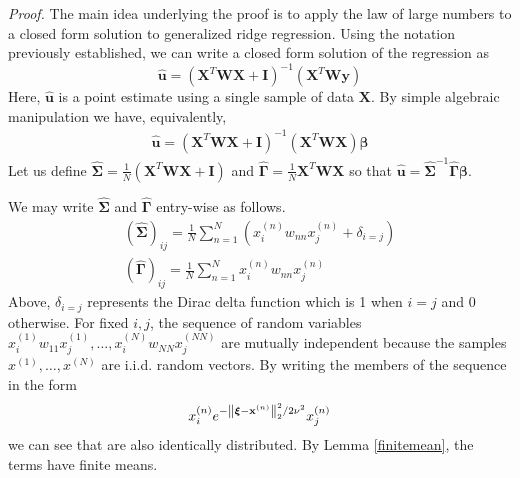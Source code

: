 \documentclass[12pt]{article}  %
\newcommand{\bx}{\mathbf{x}}
\newcommand{\bu}{\mathbf{u}}
\newcommand{\by}{\mathbf{y}}
\newcommand{\bX}{\mathbf{X}}
\newcommand{\bI}{\mathbf{I}}
\newcommand{\bW}{\mathbf{W}}
\newcommand{\bxi}{\boldsymbol{\xi}}
\newcommand{\bS}{\boldsymbol{\Sigma}}
\newcommand{\bG}{\boldsymbol{\Gamma}}
\begin{document}
\noindent \emph{Proof.}
    The main idea underlying the proof is to apply the law of large numbers to a closed form solution to generalized ridge regression. Using the notation previously established, we can write a closed form solution of the regression as
    \begin{equation}
        \label{eq:closed_form}
        \hat{\bu} = (\bX^T \bW \bX + \bI)^{-1}(\bX^T \bW \by)
    \end{equation}
    Here, $\hat{\bu}$ is a point estimate using a single sample of data $\bX$. By simple algebraic manipulation we have, equivalently, 
    \begin{gather*}
         \hat{\bu} =  (\bX^T \bW \bX + \bI)^{-1}(\bX^T \bW \bX) \boldsymbol{\beta}
    \end{gather*}
    Let us define $\hat{\bS} = \frac{1}{N}(\bX^T \bW \bX + \bI) $ and $\hat{\bG} = \frac{1}{N}\bX^T \bW \bX$ so that $\hat{\bu} = \hat{\bS}^{-1}\hat{\bG}\boldsymbol{\beta}$.
    
    We may write $\hat{\bS}$ and $\hat{\bG}$ entry-wise as follows.
    \begin{gather*}
        (\hat{\bS})_{ij} = \frac{1}{N}\sum_{n=1}^N( x_i^{(n)} w_{nn} x_j^{(n)} + \delta_{i=j}) \\
        (\hat{\bG})_{ij} = \frac{1}{N} \sum_{n=1}^N x_i^{(n)} w_{nn} x_j^{(n)} 
    \end{gather*}
    Above, $\delta_{i=j}$ represents the Dirac delta function which is 1 when $i=j$ and 0 otherwise. For fixed $i,j$, the sequence of random variables $x_i^{(1)} w_{11} x_j^{(1)},\ldots,x_i^{(N)} w_{NN} x_j^{(NN)}$ are mutually independent because the samples $x^{(1)},\ldots,x^{(N)}$ are i.i.d. random vectors. 
    By writing the members of the sequence in the form
    \begin{equation*}   
        x_i^{(n)} e^{-\norm{\bxi - \bx^{(n)}}_2^2/2\nu^2} x_j^{(n)}
    \end{equation*}
    we can see that are also identically distributed. %
    By Lemma \ref{finitemean}, the terms have finite means. 
    
\end{document}
